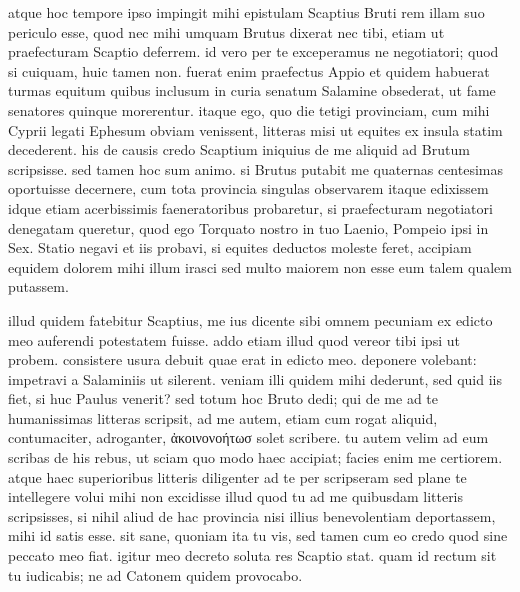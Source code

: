  atque hoc tempore ipso impingit mihi epistulam Scaptius Bruti rem illam suo periculo esse, quod nec mihi umquam Brutus dixerat nec tibi, etiam ut praefecturam Scaptio deferrem. id vero per te exceperamus ne negotiatori; quod si cuiquam, huic tamen non. fuerat enim praefectus Appio et quidem habuerat turmas equitum quibus inclusum in curia senatum Salamine obsederat, ut fame senatores quinque morerentur. itaque ego, quo die tetigi provinciam, cum mihi Cyprii legati Ephesum obviam venissent, litteras misi ut equites ex insula statim decederent. his de causis credo Scaptium iniquius de me aliquid ad Brutum scripsisse. sed tamen hoc sum animo. si Brutus putabit me quaternas centesimas oportuisse decernere, cum tota provincia singulas observarem itaque edixissem idque etiam acerbissimis faeneratoribus probaretur, si praefecturam negotiatori denegatam queretur, quod ego Torquato nostro in tuo Laenio, Pompeio ipsi in Sex. Statio negavi et iis probavi, si equites deductos moleste feret, accipiam equidem dolorem mihi illum irasci sed multo maiorem non esse eum talem qualem putassem.

 illud quidem fatebitur Scaptius, me ius dicente sibi omnem pecuniam ex edicto meo auferendi potestatem fuisse. addo etiam illud quod vereor tibi ipsi ut probem. consistere usura debuit quae erat in edicto meo. deponere volebant: impetravi a Salaminiis ut silerent. veniam illi quidem mihi dederunt, sed quid iis fiet, si huc Paulus venerit? sed totum hoc Bruto dedi; qui de me ad te humanissimas litteras scripsit, ad me autem, etiam cum rogat aliquid, contumaciter, adroganter, ἀκοινονοήτωσ solet scribere. tu autem velim ad eum scribas de his rebus, ut sciam quo modo haec accipiat; facies enim me certiorem. atque haec superioribus litteris diligenter ad te per scripseram sed plane te intellegere volui mihi non excidisse illud quod tu ad me quibusdam litteris scripsisses, si nihil aliud de hac provincia nisi illius benevolentiam deportassem, mihi id satis esse. sit sane, quoniam ita tu vis, sed tamen cum eo credo quod sine peccato meo fiat. igitur meo decreto soluta res Scaptio stat. quam id rectum sit tu iudicabis; ne ad Catonem quidem provocabo.

